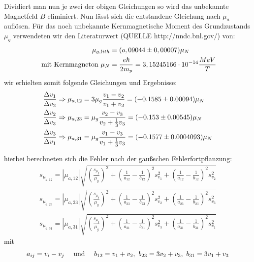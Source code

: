 \documentclass[12pt]{article}
\begin{document}
Dividiert man nun je zwei der obigen Gleichungen so wird das unbekannte Magnetfeld $B$ eliminiert. Nun lässt sich die entstandene Gleichung nach $\mu_a$
auflösen. Für das noch unbekannte Kernmagnetische Moment des Grundzustands $\mu_g$ verwendeten wir den Literaturwert (QUELLE http://nndc.bnl.gov/) von:
\begin {align*}
 \mu_{g,lith} &= (o,09044 \pm 0,00007) \mu_N \\
 \textnormal{ mit Kernmagneton } \mu_N &= \frac{e \hbar}{2 m_p} = 3,15245166 \cdot 10^{-14} \frac{MeV}{T}
\end {align*}
wir erhielten somit folgende Gleichungen und Ergebnisse:
\begin{align}
 \notag \frac{\Delta v_1}{\Delta v_2} \Rightarrow \mu_{a,12} &= 3\mu_g \frac{v_1 - v_2}{v_1 + v_2} = (-0.1585 \pm 0.00094) \mu_N \\
 \notag \frac{\Delta v_2}{\Delta v_3} \Rightarrow \mu_{a,23} &= \mu_g \frac{v_2 - v_3}{v_2 + \frac{1}{3}v_3} = (-0.153 \pm 0.00545) \mu_N \\
 \notag \frac{\Delta v_3}{\Delta v_1} \Rightarrow \mu_{a,31} &= \mu_g \frac{v_1 - v_3}{v_1 + \frac{1}{3}v_3} = (-0.1577 \pm 0.0004093) \mu_N 
\end{align}

hierbei berechneten sich die Fehler nach der gaußschen Fehlerfortpflanzung:
\begin{align*}
 s_{\mu_{a,12}} = \left| \mu _{a,12} \right| \sqrt{\left( \frac{s_{\mu_g}}{\mu_g} \right) ^2 + \left( \frac{1}{a_{12}} - \frac{1}{b_{12}} \right) ^2 s_{v_1}^2 +
    \left( \frac{1}{a_{12}} - \frac{1}{b_{12}} \right) ^2 s_{v_2}^2} \\
 s_{\mu_{a,23}} = \left| \mu _{a,23} \right| \sqrt{\left( \frac{s_{\mu_g}}{\mu_g} \right) ^2 + \left( \frac{1}{a_{23}} - \frac{1}{b_{23}} \right) ^2 s_{v_2}^2 +
    \left( \frac{1}{a_{23}} - \frac{1}{b_{23}} \right) ^2 s_{v_3}^2} \\
 s_{\mu_{a,31}} = \left| \mu _{a,31} \right| \sqrt{\left( \frac{s_{\mu_g}}{\mu_g} \right) ^2 + \left( \frac{1}{a_{31}} - \frac{1}{b_{31}} \right) ^2 s_{v_3}^2 +
    \left( \frac{1}{a_{31}} - \frac{1}{b_{31}} \right) ^2 s_{v_1}^2}
\end{align*}
mit
\begin{align*}
 a_{ij} = v_i - v_j\hspace{10pt}\textnormal{ und }\hspace{10pt}b_{12} = v_1 + v_2, ~ b_{23} = 3v_2+v_3,~b_{31}=3v_1+v_3
\end{align*}
\end{document}
